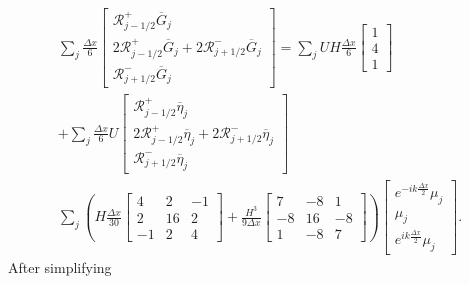 \begin{multline*}
\sum_j \frac{\Delta x}{6} \begin{bmatrix} \mathcal{R}^+_{j -1/2} \overline{G}_{j} \\2 \mathcal{R}^+_{j -1/2} \overline{G}_{j} +2 \mathcal{R}^-_{j +1/2} \overline{G}_{j}\\ \mathcal{R}^-_{j +1/2} \overline{G}_{j} \end{bmatrix} =   \sum_jUH \frac{\Delta x}{6}\begin{bmatrix} 1 \\4 \\ 1 \end{bmatrix} \\+  \sum_j \frac{\Delta x}{6} U \begin{bmatrix} \mathcal{R}^+_{j -1/2} \overline{\eta}_{j} \\2 \mathcal{R}^+_{j -1/2} \overline{\eta}_{j} +2 \mathcal{R}^-_{j +1/2} \overline{\eta}_{j}\\ \mathcal{R}^-_{j +1/2} \overline{\eta}_{j} \end{bmatrix}  \\\sum_j \left(H\frac{\Delta x}{30}\begin{bmatrix} 4 &2 &-1 \\2 &16 &2  \\-1 &2 &4 \end{bmatrix} + \frac{H^3 }{9\Delta x}\begin{bmatrix} 7 &-8 &1  \\-8 &16 &-8  \\1 &-8 &7  \end{bmatrix} \right) \begin{bmatrix} e^{-ik\frac{\Delta x}{2}}\mu_{j} \\\mu_{j} \\ e^{ik\frac{\Delta x}{2}}\mu_{j} \end{bmatrix} .
\end{multline*}
After simplifying
